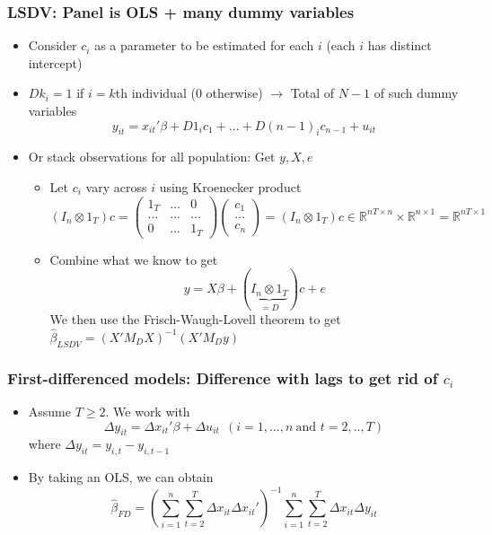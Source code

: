 \documentclass[aspectratio=169]{beamer}
\begin{document}
\begin{frame}
\frametitle{LSDV: Panel is OLS + many dummy variables}
\begin{itemize}
\item Consider $c_i$ as a parameter to be estimated for each $i$ (each $i$ has distinct intercept)
\item $Dk_i=1$ if  $i=k$th individual (0 otherwise) $\to$ Total of $N-1$ of such dummy variables 
\[
y_{it}=x_{it}'\beta + D1_ic_1+...+D(n-1)_ic_{n-1}+u_{it} 
\]
\item Or stack observations for all population: Get $y, X, e$ 
\begin{itemize}
\item Let $c_i$ vary across $i$ using Kroenecker product $(I_n \otimes 1_T)c=
\begin{pmatrix}1_T &...& 0 \\ ... &...&...\\ 0&...& 1_T \end{pmatrix}\begin{pmatrix}c_1\\ ...\\ c_n \end{pmatrix}=(I_n\otimes 1_T)c\in\mathbb{R}^{nT\times n}\times \mathbb{R}^{n\times 1}=\mathbb{R}^{nT\times 1}
$
\item Combine what we know to get 
\[
{y} = {X}\beta+(\underbrace{I_n\otimes 1_T}_{=D})c+{e}
\]
We then use the Frisch-Waugh-Lovell theorem to get $\hat{\beta}_{LSDV}=({X}'M_D{X})^{-1}({X}'M_D{y})$
\end{itemize}
\end{itemize}
\end{frame}

\begin{frame}
\frametitle{First-differenced models: Difference with lags to get rid of $c_i$ }
\begin{itemize}
\item Assume $T\geq2$. We work with
\[
\Delta y_{it}= \Delta x_{it}'\beta+\Delta u_{it}\ \ (i=1,...,n \ \text{and }t=2,..,T)
\]
where $\Delta y_{it} = y_{i,t}-y_{i,t-1}$
\item By taking an OLS, we can obtain
\[
\hat{\beta}_{FD}=\left(\sum_{i=1}^n\sum_{t=2}^T \Delta x_{it}\Delta x_{it}'\right)^{-1}\sum_{i=1}^n\sum_{t=2}^T \Delta x_{it}\Delta y_{it}
\]
\end{itemize}
\end{frame}
\end{document}
